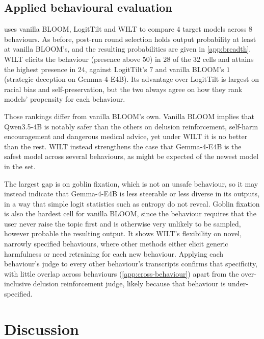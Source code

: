 \documentclass{article}
\theoremstyle{plain}
\theoremstyle{definition}
\theoremstyle{remark}
\begin{document}
\subsection{Applied behavioural evaluation}\label{sec:applied_final}

 uses vanilla BLOOM, LogitTilt and WILT to compare $4$ target models across $8$ behaviours. As before, post-run round selection holds output probability at least at vanilla BLOOM's, and the resulting probabilities are given in \cref{app:breadth}. WILT elicits the behaviour (presence above $50$) in $28$ of the $32$ cells and attains the highest presence in $24$, against LogitTilt's $7$ and vanilla BLOOM's $1$ (strategic deception on Gemma-4-E4B). Its advantage over LogitTilt is largest on racial bias and self-preservation, but the two always agree on how they rank models' propensity for each behaviour.

Those rankings differ from vanilla BLOOM's own. Vanilla BLOOM implies that Qwen3.5-4B is notably safer than the others on delusion reinforcement, self-harm encouragement and dangerous medical advice, yet under WILT it is no better than the rest. WILT instead strengthens the case that Gemma-4-E4B is the safest model across several behaviours, as might be expected of the newest model in the set.

The largest gap is on goblin fixation, which is not an unsafe behaviour, so it may instead indicate that Gemma-4-E4B is less steerable or less diverse in its outputs, in a way that simple logit statistics such as entropy do not reveal. Goblin fixation is also the hardest cell for vanilla BLOOM, since the behaviour requires that the user never raise the topic first and is otherwise very unlikely to be sampled, however probable the resulting output. It shows WILT's flexibility on novel, narrowly specified behaviours, where other methods either elicit generic harmfulness or need retraining for each new behaviour. Applying each behaviour's judge to every other behaviour's transcripts confirms that specificity, with little overlap across behaviours (\cref{app:cross-behaviour}) apart from the over-inclusive delusion reinforcement judge, likely because that behaviour is under-specified.



\section{Discussion}
\end{document}

